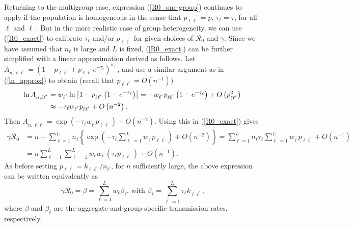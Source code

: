 \documentclass[12pt]{article}
\begin{document}
Returning to the multigroup case, expression (\ref{R0_one group}) continues to
apply if the population is homogeneous in the sense that $p_{\ell
\ell^{^{\prime}}}=p$, $\tau_{\ell}=\tau$, for all $\ell$ and $\ell^{^{\prime}%
}$. But in the more realistic case of group heterogeneity, we can use
(\ref{R0_exact}) to calibrate $\tau_{\ell}$ and/or $p_{\ell\ell^{^{\prime}}}$
for given choices of $\mathcal{R}_{0}$ and $\gamma$. Since we have assumed
that $n_{\ell}$ is large and $L$ is fixed, (\ref{R0_exact}) can be further
simplified with a linear approximation derived as follows. Let $A_{n,\ell
\ell^{^{\prime}}}=\left(  1-p_{\ell\ell^{^{\prime}}}+p_{\ell\ell^{^{\prime}}%
}e^{-\tau_{\ell}}\right)  ^{w_{\ell^{^{\prime}}}}$, and use a similar argument
as in (\ref{ln_approx}) to obtain (recall that $p_{\ell\ell^{\prime}}%
=O(n^{-1})$)%
\begin{align*}
\ln A_{n,\ell\ell^{^{\prime}}}  &  =w_{\ell^{^{\prime}}}\ln\left[
1-p_{\ell\ell^{^{\prime}}}\left(  1-e^{-\tau_{\ell}}\right)  \right]
=-w_{\ell^{^{\prime}}}p_{\ell\ell^{^{\prime}}}\left(  1-e^{-\tau_{\ell}%
}\right)  +O\left(  p_{\ell\ell^{^{\prime}}}^{2}\right) \\
&  \thickapprox-\tau_{\ell}w_{\ell^{^{\prime}}}p_{\ell\ell^{^{\prime}}%
}+O\left(  n^{-2}\right)  .
\end{align*}
Then $A_{n,\ell\ell^{^{\prime}}}=\exp\left(  -\tau_{\ell}w_{\ell^{^{\prime}}%
}p_{\ell\ell^{^{\prime}}}\right)  +O\left(  n^{-2}\right)  $. Using this in
(\ref{R0_exact}) gives
\begin{align}
\gamma\mathcal{R}_{0}  &  =n-\sum_{\ell=1}^{L}n_{\ell}\left\{  \exp\left(
-\tau_{\ell}\sum_{\ell^{^{\prime}}=1}^{L}w_{\ell^{^{\prime}}}p_{\ell
\ell^{^{\prime}}}\right)  +O\left(  n^{-2}\right)  \right\}  =\sum_{\ell
=1}^{L}n_{\ell}\tau_{\ell}\sum_{\ell^{^{\prime}}=1}^{L}w_{\ell^{^{\prime}}%
}p_{\ell\ell^{^{\prime}}}+O\left(  n^{-1}\right) \nonumber\\
&  =n\sum_{\ell=1}^{L}\sum_{\ell^{^{\prime}}=1}^{L}w_{\ell}w_{\ell^{^{\prime}%
}}\left(  \tau_{\ell}p_{\ell\ell^{^{\prime}}}\right)  +O\left(  n^{-1}\right)
. \label{R0_pll'}%
\end{align}
As before setting $p_{\ell\ell^{^{\prime}}}=k_{\ell\ell^{\prime}}%
/n_{\ell^{\prime}}$, for $n$ sufficiently large, the above expression can be
written equivalently as
\begin{equation}
\gamma\mathcal{R}_{0}=\beta=\sum_{\ell=1}^{L}w_{\ell}\beta_{\ell}\text{,
\ with }\beta_{\ell}=\sum_{\ell^{^{\prime}}=1}^{L}\tau_{\ell}k_{\ell
\ell^{\prime}}\text{,} \label{R0_multigroup}%
\end{equation}
where $\beta$ and $\beta_{\ell}$ are the aggregate and group-specific
transmission rates, respectively.
\end{document}
